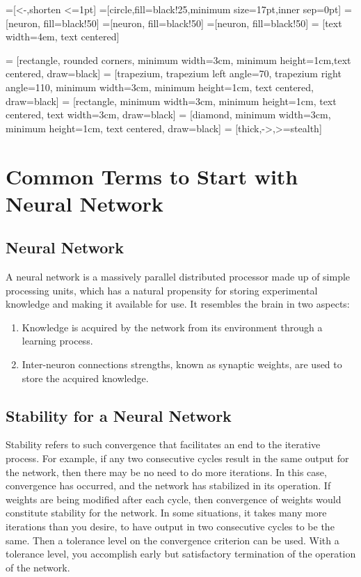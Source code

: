 \documentclass[12pt, right open]{memoir}
\begin{document}

=[<-,shorten <=1pt]
=[circle,fill=black!25,minimum size=17pt,inner sep=0pt]
=[neuron, fill=black!50]
=[neuron, fill=black!50]
=[neuron, fill=black!50]
 = [text width=4em, text centered]

 = [rectangle, rounded corners, minimum width=3cm, minimum height=1cm,text centered, draw=black]
 = [trapezium, trapezium left angle=70, trapezium right angle=110, minimum width=3cm, minimum height=1cm, text centered, draw=black]
 = [rectangle, minimum width=3cm, minimum height=1cm, text centered, text width=3cm, draw=black]
 = [diamond, minimum width=3cm, minimum height=1cm, text centered, draw=black]
 = [thick,->,>=stealth]

\chapter{Common Terms to Start with Neural Network}
\section{Neural Network}
A neural network is a massively parallel distributed processor made up of simple processing units, which has a natural propensity for storing experimental knowledge and making it available for use. It resembles the brain in two aspects:
\begin{enumerate}
\item Knowledge is acquired by the network from its environment through a learning process.
\item Inter-neuron connections strengths, known as synaptic weights, are used to store the acquired knowledge. 
\end{enumerate} 
\section{Stability for a Neural Network}
Stability refers to such convergence that facilitates an end to the iterative
process. For example, if any two consecutive cycles result in the same output
for the network, then there may be no need to do more iterations. In this case,
convergence has occurred, and the network has stabilized in its operation. If
weights are being modified after each cycle, then convergence of weights
would constitute stability for the network.
In some situations, it takes many more iterations than you desire, to have
output in two consecutive cycles to be the same. Then a tolerance level on the
convergence criterion can be used. With a tolerance level, you accomplish
early but satisfactory termination of the operation of the network.
\end{document}
